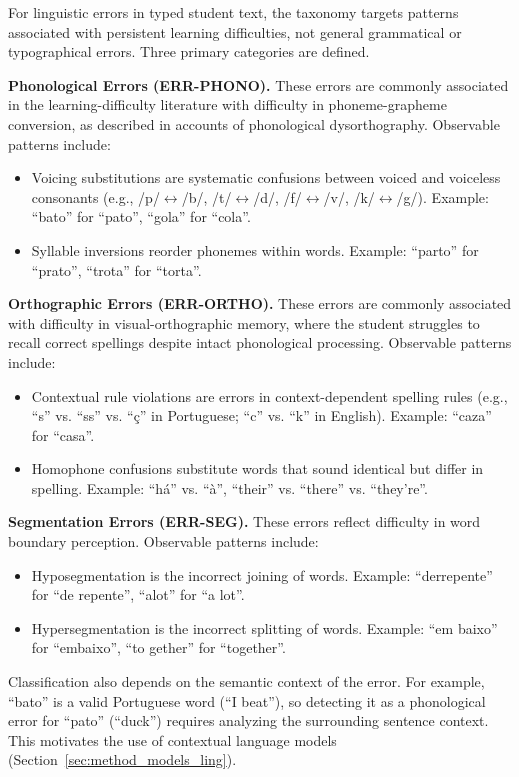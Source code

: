 For linguistic errors in typed student text, the taxonomy targets patterns associated with persistent learning difficulties, not general grammatical or typographical errors. Three primary categories are defined.

\textbf{Phonological Errors (ERR-PHONO).} These errors are commonly associated in the learning-difficulty literature with difficulty in phoneme-grapheme conversion, as described in accounts of phonological dysorthography. Observable patterns include:
\begin{itemize}
    \item Voicing substitutions are systematic confusions between voiced and voiceless consonants (e.g., /p/$\leftrightarrow$/b/, /t/$\leftrightarrow$/d/, /f/$\leftrightarrow$/v/, /k/$\leftrightarrow$/g/). Example: ``bato'' for ``pato'', ``gola'' for ``cola''.
    \item Syllable inversions reorder phonemes within words. Example: ``parto'' for ``prato'', ``trota'' for ``torta''.
\end{itemize}

\textbf{Orthographic Errors (ERR-ORTHO).} These errors are commonly associated with difficulty in visual-orthographic memory, where the student struggles to recall correct spellings despite intact phonological processing. Observable patterns include:
\begin{itemize}
    \item Contextual rule violations are errors in context-dependent spelling rules (e.g., ``s'' vs. ``ss'' vs. ``ç'' in Portuguese; ``c'' vs. ``k'' in English). Example: ``caza'' for ``casa''.
    \item Homophone confusions substitute words that sound identical but differ in spelling. Example: ``há'' vs. ``à'', ``their'' vs. ``there'' vs. ``they're''.
\end{itemize}

\textbf{Segmentation Errors (ERR-SEG).} These errors reflect difficulty in word boundary perception. Observable patterns include:
\begin{itemize}
    \item Hyposegmentation is the incorrect joining of words. Example: ``derrepente'' for ``de repente'', ``alot'' for ``a lot''.
    \item Hypersegmentation is the incorrect splitting of words. Example: ``em baixo'' for ``embaixo'', ``to gether'' for ``together''.
\end{itemize}

Classification also depends on the semantic context of the error. For example, ``bato'' is a valid Portuguese word (``I beat''), so detecting it as a phonological error for ``pato'' (``duck'') requires analyzing the surrounding sentence context. This motivates the use of contextual language models (Section~\ref{sec:method_models_ling}).

